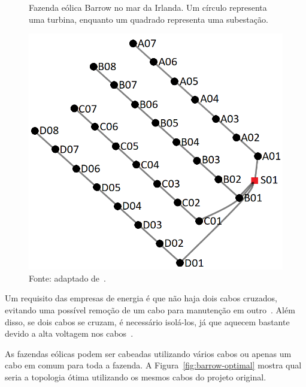 \begin{figure}[!htb]
  \centering
  \caption[Fazenda eólica Barrow]{
    Fazenda eólica Barrow no mar da Irlanda.
    Um círculo representa uma turbina, enquanto um quadrado representa uma subestação.
  }
  \includegraphics[scale=0.4]{estrutura/textuais/figuras/barrow-farm-connected.png}
  \caption*{Fonte: adaptado de~.}
  \label{fig:barrowfarm}
\end{figure}

Um requisito das empresas de energia é que não haja dois cabos cruzados, evitando uma possível remoção de um cabo para manutenção em outro~\cite{fischetti2017}.
Além disso, se dois cabos se cruzam, é necessário isolá-los, já que aquecem bastante devido a alta voltagem nos cabos~\cite{bauer2015}.

As fazendas eólicas podem ser cabeadas utilizando vários cabos ou apenas um cabo em comum para toda a fazenda.
A Figura~\ref{fig:barrow-optimal} mostra qual seria a topologia ótima utilizando os mesmos cabos do projeto original.

